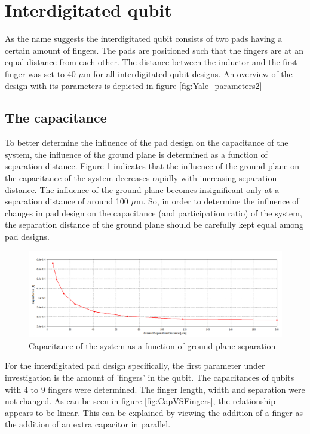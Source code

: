 \clearpage
\section{Interdigitated qubit}
As the name suggests the interdigitated qubit consists of two pads having a certain amount of fingers. The pads are positioned such that the fingers are at an equal distance from each other. The distance between the inductor and the first finger was set to 40 \(\mu\)m for all interdigitated qubit designs. An overview of the design with its parameters is depicted in figure \ref{fig:Yale_parameters2}




\subsection{The capacitance}
To better determine the influence of the pad design on the capacitance of the system, the influence of the ground plane is determined as a function of separation distance. Figure \ref{fig:capacitance_vs_slotsize} indicates that the influence of the ground plane on the capacitance of the system decreases rapidly with increasing separation distance. The influence of the ground plane becomes insignificant only at a separation distance of around 100 \(\mu\)m. So, in order to determine the influence of changes in pad design on the capacitance (and participation ratio) of the system, the separation distance of the ground plane should be carefully kept equal among pad designs.  

\begin{figure}
	\centering
	\includegraphics[width = \textwidth]{Figures/capacitance_vs_slotsize_edit}
	\caption{Capacitance of the system as a function of ground plane separation}
	\label{fig:capacitance_vs_slotsize}
\end{figure}

For the interdigitated pad design specifically, the first parameter under investigation is the amount of 'fingers' in the  qubit. The capacitances of qubits with 4 to 9 fingers were determined. The finger length, width and separation were not changed.
As can be seen in figure \ref{fig:CapVSFingers}, the relationship appears to be linear. This can be explained by viewing the addition of a finger as the addition of an extra capacitor in parallel.\\

